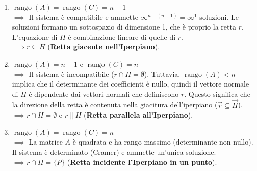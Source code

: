 {    \begin{enumerate}
        \item \(\operatorname{rango}(A) = \operatorname{rango}(C) = n-1\) \\
        \(\implies\) Il sistema è compatibile e ammette \(\infty^{n-(n-1)} = \infty^1\) soluzioni. 
        Le soluzioni formano un sottospazio di dimensione 1, che è proprio la retta \(r\). L'equazione di \(H\) è combinazione lineare di quelle di \(r\). \\
        \(\implies r \subseteq H\) (\textbf{Retta giacente nell'Iperpiano}).

        \item \(\operatorname{rango}(A) = n-1\) e \(\operatorname{rango}(C) = n\) \\
        \(\implies\) Il sistema è incompatibile (\(r \cap H = \emptyset\)). 
        Tuttavia, \(\operatorname{rango}(A) < n\) implica che il determinante dei coefficienti è nullo, quindi il vettore normale di \(H\) è dipendente dai vettori normali che definiscono \(r\). Questo significa che la direzione della retta è contenuta nella giacitura dell'iperpiano (\(\vec{r} \subseteq \vec{H}\)). \\
        \(\implies r \cap H = \emptyset\) e \(r \parallel H\) (\textbf{Retta parallela all'Iperpiano}).

        \item \(\operatorname{rango}(A) = \operatorname{rango}(C) = n\) \\
        \(\implies\) La matrice \(A\) è quadrata e ha rango massimo (determinante non nullo). Il sistema è determinato (Cramer) e ammette un'unica soluzione. \\
        \(\implies r \cap H = \{P\}\) (\textbf{Retta incidente l'Iperpiano in un punto}).
    \end{enumerate}
}

